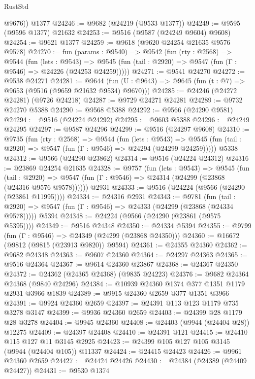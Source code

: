 \begin{lexlean}{RustStd}
\begin{coremodule}
        @9676))
    @1377
@24246 := @9682 (@24219 (@9533 @1377))
@24249 := @9595 (@9596 @1377) @21632
@24253 := @9516 (@9587 (@24249 @9604) @9608)
@24254 := @9621 @1377
@24259 := @9618 (@9620 @24254 @21635 @9576 @9578)
@24270 := fun (params : @9540) =>
  @9542
    (fun (rty : @2568) =>
    @9544
      (fun (lets : @9543) =>
      @9545 (fun (tail : @2920) => @9547 (fun (Γ : @9546) => @24226 (@24253 @24259)))))
@24271 := @9541 @24270
@24272 := @9538 @24271
@24281 := @9644
    (fun (U : @9643) => @9645 (fun (t : @7) => @9653 (@9516 (@9659 @21632 @9534) @9670)))
@24285 := @24246 (@24272 @24281) (@9726 @24218)
@24287 := @9729 @24271 @24281
@24289 := @9732 @24270 @5388
@24290 := @9568 @5388
@24292 := @9566 (@24290 @9581)
@24294 := @9516 (@24224 @24292)
@24295 := @9603 @5388
@24296 := @24249 @24295
@24297 := @9587 @24296
@24299 := @9516 (@24297 @9608)
@24310 := @9735
    (fun (rty : @2568) =>
    @9544
      (fun (lets : @9543) =>
      @9545 (fun (tail : @2920) => @9547 (fun (Γ : @9546) => @24294 (@24299 @24259)))))
    @5338
@24312 := @9566 (@24290 @23862)
@24314 := @9516 (@24224 @24312)
@24316 := @23869 @24254 @21635
@24328 := @9757
    (fun (lets : @9543) =>
    @9545
      (fun (tail : @2920) =>
      @9547 (fun (Γ : @9546) => @24314 (@24299 (@23868 (@24316 @9576 @9578))))))
    @2931
@24333 := @9516 (@24224 (@9566 (@24290 (@23861 @11995))))
@24334 := @24316 @2931
@24343 := @9781
    (fun (tail : @2920) => @9547 (fun (Γ : @9546) => @24333 (@24299 (@23868 (@24334 @9578)))))
    @5394
@24348 := @24224 (@9566 (@24290 (@23861 (@9575 @5395))))
@24349 := @9516 @24348
@24350 := @24334 @5394
@24355 := @9799 (fun (Γ : @9546) => @24349 (@24299 (@23868 @24350)))
@24360 := @16672 (@9812 (@9815 (@23913 @9820)) @9594)
@24361 := @24355 @24360
@24362 := @9682 @24348
@24363 := @9607 @24360
@24364 := @24297 @24363
@24365 := @9516 @24364
@24367 := @9614 @24360 @23867
@24368 := @24367 @24350
@24372 := @24362 (@24365 @24368) (@9835 @24223)
@24376 := @9682 @24364 @24368 (@9840 @24296)
@24384 := @10939 @24360 @1374 @377 @1351 @1179 @2931 @3966 @1839
@24389 := @9915 @24360 @2659 @377 @1351 @3966
@24391 := @9924 @24360 @2659
@24397 := @24391 @113 @123 @1179 @735 @3278 @3147
@24399 := @9936 @24360 @2659
@24403 := @24399 @28 @1179 @28 @3278
@24404 := @9945 @24360
@24408 := @24403 (@9944 (@24404 @28)) @12275
@24409 := @24397 @24408
@24410 := @24391 @121
@24415 := @24410 @115 @127 @11 @3145 @2925
@24423 := @24399 @105 @127 @105 @3145 (@9944 (@24404 @105)) @11337
@24424 := @24415 @24423
@24426 := @9961 @24360 @2659
@24427 := @24424 @24426
@24430 := @24384 (@24389 (@24409 @24427))
@24431 := @9530 @1374

\end{coremodule}
\end{lexlean}
